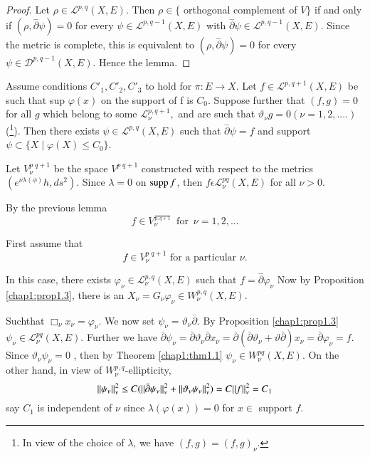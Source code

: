 \begin{proof}
  Let $\rho \in \mathcal{L}^{p,q}(X,E)$. Then $ \rho  \in \{$
  orthogonal  complement of $ V\} $ if  
  and only if  $(\rho ,\overset{-}{\partial } \psi)=0 $  for every
  $\psi \in \mathcal{L}^{p,q-1} (X,E)$ with  
  $\overset{-}{\partial} \psi \in  \mathcal{L}^{p,q-1}(X,E)$. Since
  the metric  is complete, this is equivalent to
  $(\rho,\overset{-}{\partial} \psi) = 0 $ for every $\psi \in
  \mathscr{D}^{p,q-1}(X,E)$. Hence the lemma.
\end{proof}

\begin{theorem}\label{chap1:thm1.5}%
  Assume conditions  $C'_{1},C'_{2},C'_{3} $ to hold for 
  $\pi : E \rightarrow X$.  Let $f \in \mathcal{L}^{p,q+1}(X,E) $ be
  such that sup  $\varphi (x)$  on the support of f is $C_{0}$. 
  Suppose further that $(f,g) = 0$  for all $g$ which belong to some  $
  \mathcal{L}^{p,q+1}_{\nu},$ and are such that  
  $\vartheta_{\nu} g= 0 (\nu = 1,2,....)$(\footnote{In view of the
    choice of $\lambda$, we have $(f,g) = (f,g)_\nu$.}).  Then there exists
  $\psi \in \mathcal{L}^{p,q}(X,E)$ 
  such that  $ \overset{-}{\partial} \psi = f $ and support  $\psi
  \subset \{ X \mid \varphi (X) \leq C_{0} \}$. 
\end{theorem}
  
Let $V^{p \; q+1}_{\nu}  $ be the  space  $ V^{p \; q+1} $ constructed with
respect to the metrics  \break $(e^{ \nu \lambda (\phi)} h,ds^{2}) $. Since  
$ \lambda =0$ on $\operatorname{supp} f$, then  $f \epsilon  \mathcal{L}^{pq}_{\nu}
(X,E)$ for all $\nu > 0$.  
  
By the previous lemma
$$ 
f \in  V_{\nu}^{\frac{}{p, q+1}} \; ~\text {for}~ \;  \nu = 1,2,...
$$
  
First assume that  
$$ 
f \in V_{\nu}^{p \; q+1} \text{ for a particular } \nu. 
$$

In this case, there exists  $\varphi_{\nu} \in
\mathcal{L}^{p,q}_{\nu}(X,E)$ such that $f = \overset{-}{\partial}
\varphi_{\nu}$ 
Now by Proposition \ref{chap1:prop1.3}, there  is an  $X_{\nu} =
G_{\nu} \varphi_{\nu} \in   W^{p,q}_{\nu}(X,E)$.  

Such\pageoriginale that $\Box_\nu x_\nu = \varphi_\nu$. We now set $\psi_\nu
= \vartheta_\nu \bar{\partial}$. By Proposition \ref{chap1:prop1.3} $\psi_\nu \in 
\mathcal{L}^{pq}_\nu (X,E)$. Further we have $\bar{\partial}\psi_\nu =
\bar{\partial}\vartheta_\nu \bar{\partial}x_\nu =
\bar{\partial}(\bar{\partial} \vartheta_\nu  + \vartheta
\bar{\partial})x_\nu = \bar{\partial}\varphi_\nu = f$. Since
$\vartheta_\nu \psi_\nu = 0$ , then by Theorem \ref{chap1:thm1.1} $\psi_\nu \in
W^{pq}_\nu(X,E)$. On the other hand, in view of
$W^{p,q}_\nu$-ellipticity,   
$$
 \Arrowvert \psi_\nu \Arrowvert^2_\nu \leq C(\Arrowvert
\bar{\partial} \psi_\nu \Arrowvert^2_\nu + \Arrowvert \vartheta_\nu
\psi_\nu \Arrowvert^2_\nu) = C \Arrowvert f \Arrowvert^2_\nu =
C_1
$$
 say $C_1$ is independent of $\nu $ since $\lambda (\varphi(x)) =
0$ for $x\in $ support $f$. 

